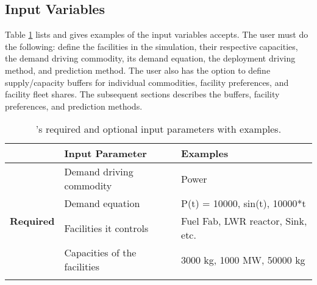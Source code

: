 \subsection{Input Variables}
Table \ref{tab:inputs} lists and gives examples of the input 
variables \deploy accepts. 
The user must do the following: 
define the facilities in the simulation, their respective 
capacities, the demand driving commodity,
its demand equation, the deployment driving method, 
and prediction method. 
The user also has the option to define supply/capacity buffers 
for individual commodities, facility preferences, and facility 
fleet shares.  
The subsequent sections describes 
the buffers, facility preferences, and prediction methods. 


\begin{table}[]
	\centering
    \caption{\deploy's required and optional input parameters with examples.}
    \label{tab:inputs}
        \footnotesize
        \begin{tabular}{l|ll}
        \hline
            & \textbf{Input Parameter}                                                           & \textbf{Examples}                                                                                                          \\ \hline
            \multirow{5}{*}{\textbf{Required}} & Demand driving commodity                                                           & Power                                                                                                                      \\ \cline{2-3} 
                                                      & Demand equation                                                                    & P(t) = 10000, sin(t), 10000*t                                                                                                                 \\ \cline{2-3} 
                                                      & Facilities it controls                                                             & Fuel Fab, LWR reactor, Sink, etc.                                                                                                      \\ \cline{2-3} 
                                                      & Capacities of the facilities                                                       & 3000 kg, 1000 MW, 50000 kg                                                                                                     \\ \cline{2-3} 

\end{tabular}
\end{table}
